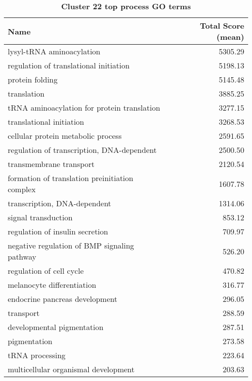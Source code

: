 \begin{table}[h]
\begin{center} \sf
\begin{tabular}{p{}r}
\toprule
\textbf{Name}                                  & \textbf{Total Score (mean)} \\ \midrule
lysyl-tRNA aminoacylation                      & 5305.29                     \\
regulation of translational initiation         & 5198.13                     \\
protein folding                                & 5145.48                     \\
translation                                    & 3885.25                     \\
tRNA aminoacylation for protein translation    & 3277.15                     \\
translational initiation                       & 3268.53                     \\
cellular protein metabolic process             & 2591.65                     \\
regulation of transcription, DNA-dependent     & 2500.50                     \\
transmembrane transport                        & 2120.54                     \\
formation of translation preinitiation complex & 1607.78                     \\
transcription, DNA-dependent                   & 1314.06                     \\
signal transduction                            & 853.12                      \\
regulation of insulin secretion                & 709.97                      \\
negative regulation of BMP signaling pathway   & 526.20                      \\
regulation of cell cycle                       & 470.82                      \\
melanocyte differentiation                     & 316.77                      \\
endocrine pancreas development                 & 296.05                      \\
transport                                      & 288.59                      \\
developmental pigmentation                     & 287.51                      \\
pigmentation                                   & 273.58                      \\
tRNA processing                                & 223.64                      \\
multicellular organismal development           & 203.63                      \\ \bottomrule
\end{tabular}
\end{center}

\caption[Cluster 22 top process GO terms]{\sf \textbf{Cluster 22 top process GO terms}}
\label{tab:cls22-process}
\end{table}
